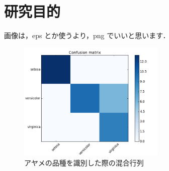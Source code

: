 \section{研究目的}

画像は，eps とか使うより，png でいいと思います．
\begin{figure}[htbp]
  \begin{center}
    \includegraphics[width=7cm]{img/iris_confusion_matrix.png}
    \caption{アヤメの品種を識別した際の混合行列}
    \label{fig:one}
  \end{center}
\end{figure}\
